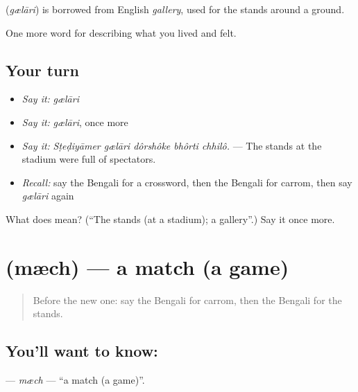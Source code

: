 \begin{cousinweb}
\textbf{} (\emph{gælāri}) is borrowed from English \emph{gallery}, used for the stands around a ground.
\end{cousinweb}

\begin{grammarlens}[title={What you've built}]
One more word for describing what you lived and felt.
\end{grammarlens}

\subsection*{Your turn}
\begin{itemize}
\raggedright
  \item \emph{Say it:} \emph{gælāri}
  \item \emph{Say it:} \emph{gælāri}, once more
  \item \emph{Say it:} \emph{Sṭeḍiyāmer gælāri dôrshôke bhôrti chhilô.} — The stands at the stadium were full of spectators.
  \item \emph{Recall:} say the Bengali for a crossword, then the Bengali for carrom, then say \emph{gælāri} again
\end{itemize}

\begin{tcolorbox}[breakable,colback=teal!4,colframe=teal!35!black,title={Before you move on}]
What does  mean? (\textquotedblleft{}The stands (at a stadium); a gallery\textquotedblright{}.) Say it once more.
\end{tcolorbox}
\section[\texorpdfstring{\bn{ম্যাচ} (mæch)}{ম্যাচ (mæch)}]{ (mæch) — a match (a game)}

\label{lesson:BN-C519-mech}



\begin{quote}
Before the new one: say the Bengali for carrom, then the Bengali for the stands.
\end{quote}

\subsection*{You'll want to know: }
\textbf{} — \emph{mæch} — \textquotedblleft{}a match (a game)\textquotedblright{}.

